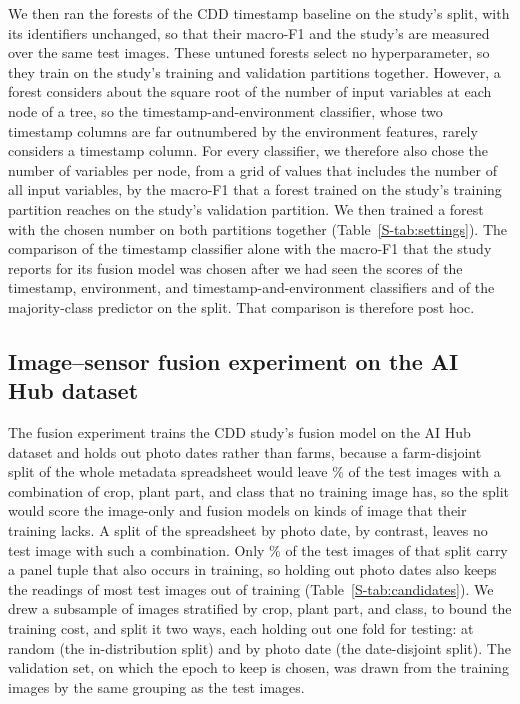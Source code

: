 \documentclass[preprint,12pt,authoryear,nopreprintline]{elsarticle}
\begin{document}
We then ran the forests of the CDD timestamp baseline on the study's split, with its
identifiers unchanged, so that their macro-F1 and the study's are measured over the
same test images. These untuned forests select no hyperparameter, so they train on the
study's training and validation partitions together. However, a forest considers about
the square root
of the number of input variables at each node of a tree, so the
timestamp-and-environment classifier, whose two timestamp columns are far outnumbered by the environment features, rarely considers a timestamp column. For every classifier,
we therefore also chose the number of variables per node, from a grid of values that
includes the number of all input variables, by the macro-F1 that a forest trained on the study's training
partition reaches on the study's validation partition. We then trained a forest with
the chosen number on both partitions together (Table~\ref{S-tab:settings}). The comparison of the timestamp classifier alone with the macro-F1 that the study
reports for its fusion model was chosen after we had seen the scores of the timestamp, environment, and timestamp-and-environment classifiers and
of the majority-class predictor on the split. That comparison is therefore post hoc.

\subsection{Image--sensor fusion experiment on the AI Hub dataset}
\label{sec:fusion-design}

The fusion experiment trains the CDD study's fusion model on the AI Hub dataset and
holds out photo dates rather than farms, because a farm-disjoint split of the whole
metadata spreadsheet would leave \farmUncoveredPct{}\% of the test images with a
combination of crop, plant part, and class that no training image has, so the split would score the image-only and fusion models on kinds of image that their
training lacks. A split of the
spreadsheet by photo date, by contrast, leaves no test image with such a combination.
Only \candidateDateLeak{}\% of the test images of that split carry a panel tuple that
also occurs in training, so holding out photo dates also keeps the readings of most test images out
of training (Table~\ref{S-tab:candidates}). We drew a subsample of
\subsampleSize{} images stratified by crop, plant part, and class, to bound the
training cost, and split it two ways, each holding out one fold for testing: at random
(the in-distribution split) and by photo date (the date-disjoint split). The validation set, on which the epoch to keep is chosen, was drawn from the training
images by the same grouping as the test images.
\end{document}
